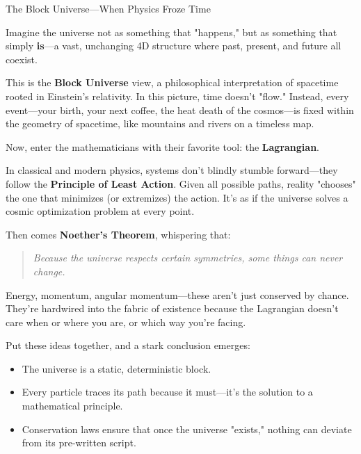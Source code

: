 \begin{HistoricalSidebar}{The Block Universe—When Physics Froze Time}

    Imagine the universe not as something that "happens," but as something that simply \textbf{is}—a vast, unchanging 4D structure where past, present, and future all coexist.

    \medskip
    
    This is the \textbf{Block Universe} view, a philosophical interpretation of spacetime rooted in Einstein’s relativity. In this picture, time doesn’t "flow." Instead, every event—your birth, your next coffee, the heat death of the cosmos—is fixed within the geometry of spacetime, like mountains and rivers on a timeless map.
    
    \medskip
    
    Now, enter the mathematicians with their favorite tool: the \textbf{Lagrangian}.

    \medskip
    
    In classical and modern physics, systems don’t blindly stumble forward—they follow the \textbf{Principle of Least Action}. Given all possible paths, reality "chooses" the one that minimizes (or extremizes) the action. It’s as if the universe solves a cosmic optimization problem at every point.
    
    \medskip
    
    Then comes \textbf{Noether’s Theorem}, whispering that:

    \medskip
    
    \begin{quote}
    \textit{Because the universe respects certain symmetries, some things can never change.}
    \end{quote}
    
    Energy, momentum, angular momentum—these aren’t just conserved by chance. They’re hardwired into the fabric of existence because the Lagrangian doesn’t care when or where you are, or which way you’re facing.
    
    \medskip
    
    Put these ideas together, and a stark conclusion emerges:

    \medskip
    
    \begin{itemize}
      \item The universe is a static, deterministic block.
      \item Every particle traces its path because it must—it’s the solution to a mathematical principle.
      \item Conservation laws ensure that once the universe "exists," nothing can deviate from its pre-written script.
    \end{itemize}


\end{HistoricalSidebar}
